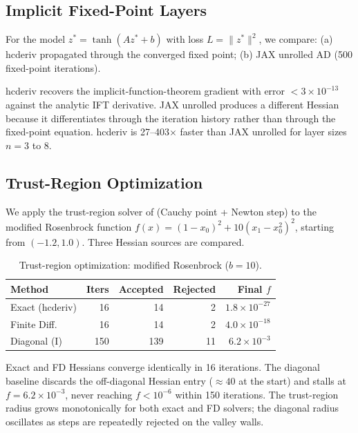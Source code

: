 \documentclass[11pt]{article}
\begin{document}
\subsection{Implicit Fixed-Point Layers}

For the model $z^* = \tanh(Az^* + b)$ with loss $L = \|z^*\|^2$, we compare:
(a) hcderiv propagated through the converged fixed point;
(b) JAX unrolled AD (500 fixed-point iterations).

hcderiv recovers the implicit-function-theorem gradient with error
$< 3 \times 10^{-13}$ against the analytic IFT derivative. JAX unrolled produces a
different Hessian because it differentiates through the iteration history rather than
through the fixed-point equation. hcderiv is 27--403$\times$ faster than JAX
unrolled for layer sizes $n = 3$ to $8$.

\subsection{Trust-Region Optimization}

We apply the trust-region solver of \citet{nocedal2006} (Cauchy point + Newton step)
to the modified Rosenbrock function $f(x) = (1-x_0)^2 + 10(x_1 - x_0^2)^2$,
starting from $(-1.2, 1.0)$. Three Hessian sources are compared.

\begin{table}[h]
\centering
\caption{Trust-region optimization: modified Rosenbrock ($b=10$).}
\label{tab:trustregion}
\begin{tabular}{lrrrr}
\toprule
Method           & Iters & Accepted & Rejected & Final $f$ \\
\midrule
Exact (hcderiv)  &  16   &   14     &    2     & $1.8 \times 10^{-27}$ \\
Finite Diff.     &  16   &   14     &    2     & $4.0 \times 10^{-18}$ \\
Diagonal (I)     & 150   &  139     &   11     & $6.2 \times 10^{-3}$  \\
\bottomrule
\end{tabular}
\end{table}

Exact and FD Hessians converge identically in 16 iterations. The diagonal baseline
discards the off-diagonal Hessian entry ($\approx 40$ at the start) and stalls at
$f = 6.2 \times 10^{-3}$, never reaching $f < 10^{-6}$ within 150 iterations. The
trust-region radius grows monotonically for both exact and FD solvers; the diagonal
radius oscillates as steps are repeatedly rejected on the valley walls.
\end{document}
